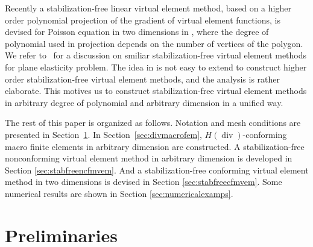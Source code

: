 \documentclass[10pt]{amsart}
\renewcommand{\div}{\operatorname{div}}
\numberwithin{equation}{section}
\begin{document}
Recently a stabilization-free linear virtual element method, based on a higher order polynomial projection of the gradient of virtual element functions, is devised for Poisson equation in two dimensions in \cite{BerroneBorioMarcon2021,BerroneBorioMarcon2022}, where the degree of polynomial used in projection depends on the number of vertices of the polygon. We refer to~\cite{DAltriMirandaPatrunoSacco2021} for a discussion on smiliar stabilization-free virtual element methods for plane elasticity problem.
The idea in \cite{BerroneBorioMarcon2021,BerroneBorioMarcon2022} is not easy to extend to construct higher order stabilization-free virtual element methods, and
the analysis is rather elaborate. 
This motives us to construct stabilization-free virtual element methods in arbitrary degree of polynomial and arbitrary dimension in a unified way.







The rest of this paper is organized as follows. Notation and mesh conditions are presented in Section~\ref{sec:prelim}. 
In Section~\ref{sec:divmacrofem}, $H(\div)$-conforming macro finite elements in arbitrary dimension are constructed. A stabilization-free nonconforming virtual element method in arbitrary dimension is developed in Section \ref{sec:stabfreencfmvem}. And a stabilization-free conforming virtual element method in two dimensions is devised in Section \ref{sec:stabfreecfmvem}.
Some numerical results are shown in Section \ref{sec:numericalexamps}.


\section{Preliminaries}\label{sec:prelim}
\end{document}
